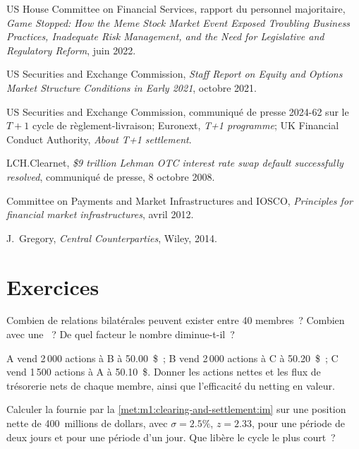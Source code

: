 \begin{omsources}
\item US House Committee on Financial Services, rapport du personnel majoritaire,
\emph{Game Stopped: How the Meme Stock Market Event Exposed Troubling
Business Practices, Inadequate Risk Management, and the Need for Legislative
and Regulatory Reform}, juin 2022.
\item US Securities and Exchange Commission, \emph{Staff Report on Equity and
Options Market Structure Conditions in Early 2021}, octobre 2021.
\item US Securities and Exchange Commission, communiqué de presse 2024-62 sur le
$T{+}1$ cycle de règlement-livraison; Euronext, \emph{T+1 programme}; UK Financial
Conduct Authority, \emph{About T+1 settlement}.
\item LCH.Clearnet, \emph{\$9 trillion Lehman OTC interest rate swap default
successfully resolved}, communiqué de presse, 8 octobre 2008.
\item Committee on Payments and Market Infrastructures and IOSCO,
\emph{Principles for financial market infrastructures}, avril 2012.
\item J.~Gregory, \emph{Central Counterparties}, Wiley, 2014.
\end{omsources}

\section{Exercices}

\begin{exercise}[$\star$]\label{exo:m1:clearing-and-settlement:1}
Combien de relations bilatérales peuvent exister entre 40 membres~? Combien
avec une ~? De quel facteur le nombre diminue-t-il~?
\end{exercise}

\begin{exercise}[$\star$]\label{exo:m1:clearing-and-settlement:2}
A vend 2\,000 actions à B à 50.00~\$~; B vend 2\,000 actions à C à 50.20~\$~; C vend
1\,500 actions à A à 50.10~\$. Donner les actions nettes et les flux de trésorerie nets de chaque membre, ainsi que
l'efficacité du netting en valeur.
\end{exercise}

\begin{exercise}[$\star$]\label{exo:m1:clearing-and-settlement:3}
Calculer la  fournie par la \cref{met:m1:clearing-and-settlement:im} sur
une position nette de 400~millions de dollars, avec $\sigma = 2.5\%$, $z = 2.33$, pour une
période de deux jours et pour une période d'un jour. Que libère le cycle le plus court~?
\end{exercise}

